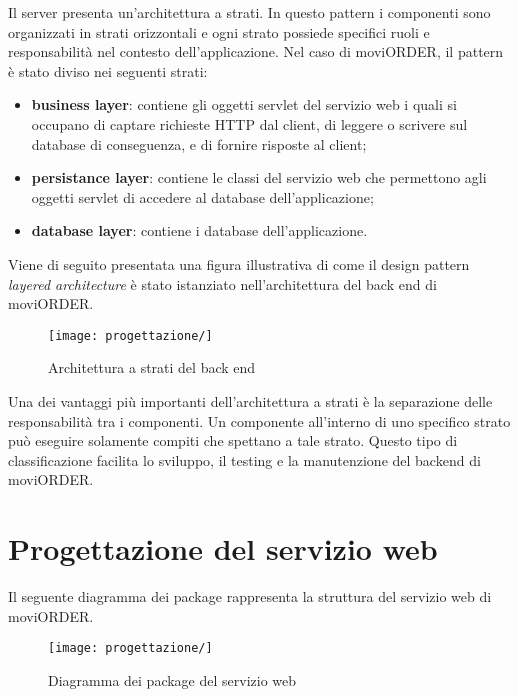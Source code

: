 Il server presenta un'architettura a strati. In questo pattern i componenti sono organizzati in strati orizzontali e ogni strato possiede specifici ruoli e responsabilità nel contesto dell'applicazione. Nel caso di moviORDER, il pattern è stato diviso nei seguenti strati:
\begin{itemize}
	\item \textbf{business layer}: contiene gli oggetti servlet del servizio web i quali si occupano di captare richieste HTTP dal client, di leggere o scrivere sul database di conseguenza, e di fornire risposte al client;
	\item \textbf{persistance layer}: contiene le classi del servizio web che permettono agli oggetti servlet di accedere al database dell'applicazione;
	\item \textbf{database layer}: contiene i database dell'applicazione.
\end{itemize}
Viene di seguito presentata una figura illustrativa di come il design pattern \textit{layered architecture} è stato istanziato nell'architettura del back end di moviORDER. 

\begin{figure}[!h] 
    \centering 
    \texttt{[image: progettazione/]} 
    \caption{Architettura a strati del back end}
\end{figure}

Una dei vantaggi più importanti dell'architettura a strati è la separazione delle responsabilità tra i componenti. Un componente all'interno di uno specifico strato può eseguire solamente compiti che spettano a tale strato. Questo tipo di classificazione facilita lo sviluppo, il testing e la manutenzione del backend di moviORDER.

\section{Progettazione del servizio web}

Il seguente diagramma dei package rappresenta la struttura del servizio web di moviORDER.

\begin{figure}[!h] 
    \centering 
    \texttt{[image: progettazione/]} 
    \caption{Diagramma dei package del servizio web}
\end{figure}

